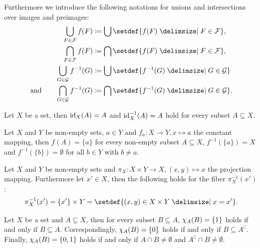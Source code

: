 \begin{remarks}
\begin{remarkenumerate}
\begin{align}
\begin{split}
        \end{split}\end{align}
        Furthermore we introduce the following notations for unions and intersections over images and preimages:
        \begin{align}\begin{split}
        \bigcup_{F\in\mathcal F}f(F)&\coloneq \bigcup\setdef{f(F)\given F\in\mathcal F},\\
        \bigcap_{F\in\mathcal F}f(F)&\coloneq \bigcap\setdef{f(F)\given F\in\mathcal F},\\
        \bigcup_{G\in\mathcal G}f^{-1}(G)&\coloneq \bigcup\setdef{f^{-1}(G)\given G\in\mathcal G}\\
        \text{and}\qquad\bigcap_{G\in\mathcal G}f^{-1}(G)&\coloneq \bigcap\setdef{f^{-1}(G)\given G\in\mathcal G}. 
        \end{split}\end{align}
    \end{remarkenumerate}
\end{remarks}

\begin{examples}
    \begin{exampleenumerate}
        \item Let $X$ be a set, then $\text{id}_X(A)=A$ and $\text{id}_X^{-1}(A)=A$ hold for every subset $A\subseteq X$.
        \item Let $X$ and $Y$ be non-empty sets, $a\in Y$ and $f_a\colon X\rightarrow Y,x\mapsto a$ the constant mapping, then $f(A)=\{a\}$ for every non-empty subset $A\subseteq X$, $f^{-1}(\{a\})=X$ and $f^{-1}(\{b\})=\emptyset$ for all $b\in Y$ with $b\neq a$.
        \item Let $X$ and $Y$ be non-empty sets and $\pi_X\colon X\times Y\rightarrow X, (x,y)\mapsto x$ the projection mapping. Furthermore let $x'\in X$, then the following holds for the fiber $\pi_X^{-1}(x')$:
        \begin{align}\pi_X^{-1}(x')=\{x'\}\times Y=\setdef{(x,y)\in X\times Y\given x=x'}.\end{align}
        \item Let $X$ be a set and $A\subseteq X$, then for every subset $B\subseteq A$, $\chi_A(B)=\{1\}$ holds if and only if $B\subseteq A$. Correspondingly, $\chi_A(B)=\{0\}$ holds if and only if $B\subseteq A^\complement$. Finally, $\chi_A(B)=\{0,1\}$ holds if and only if $A\cap B\neq\emptyset$ and $A^\complement\cap B\neq\emptyset$.
    \end{exampleenumerate}
\end{examples}

